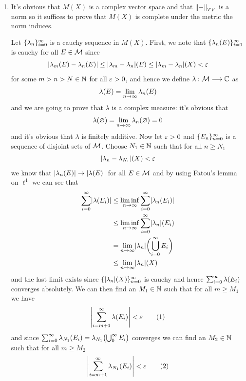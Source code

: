 \documentclass{article}
\begin{document}
\begin{homeworkProblem}
    \begin{enumerate}[label=\alph*.]
        \item It's obvious that $M(X)$ is a complex vector space and that $\norm{-}_{TV}$ is a norm so it suffices to prove that $M(X)$ is complete under the metric the norm induces.
        
        Let $\{\lambda_n\}_{i=0}^\infty$ is a cauchy sequence in $M(X)$. First, we note that $\{\lambda_n(E)\}_{i=0}^\infty$ is cauchy for all $E\in\mathcal{M}$ since
        \[\abs{\lambda_m(E)-\lambda_n(E)} \leq \abs{\lambda_m-\lambda_n}(E) \leq \abs{\lambda_m-\lambda_n}(X) < \eps\]
        for some $m>n>N\in\mathbb{N}$ for all $\varepsilon>0$, and hence we define $\lambda:\mathcal{M}\longrightarrow \mathbb{C}$ as
        \[\lambda(E) = \lim_{n\to\infty}\lambda_n(E)\]
        and we are going to prove that $\lambda$ is a complex measure: it's obvious that
        \[\lambda(\varnothing)=\lim_{n\to\infty}\lambda_n(\varnothing)=0\]
        and it's obvious that $\lambda$ is finitely additive. Now let $\varepsilon>0$ and $\{E_n\}_{n=0}^\infty$ is a sequence of disjoint sets of $\mathcal{M}$. Choose $N_1\in\mathbb{N}$ such that for all $n\geq N_1$
        \[\abs{\lambda_n-\lambda_{N_1}}(X)<\eps\]
        we know that $\abs{\lambda_n(E)}\to\abs{\lambda(E)}$ for all $E\in\mathcal{M}$ and by using Fatou's lemma on $\ell^1$ we can see that
        \begin{align*}
            \sum_{i=0}^\i\abs{\lambda(E_i)} &\leq \liminf_{n\to\i}\sum_{i=0}^\i\abs{\lambda_n(E_i)} \\
            &\leq \liminf_{n\to\i}\sum_{i=0}^\i\abs{\lambda_n}(E_i) \\
            &= \lim_{n\to\i}\abs{\lambda_n}\biggl(\bigcup_{i=0}^\i E_i\biggr) \\
            &\leq \lim_{n\to\i}\abs{\lambda_n}(X)
        \end{align*}
        and the last limit exists since $\{\abs{\lambda_n}(X)\}_{n=0}^\i$ is cauchy and hence $\sum_{i=0}^\infty\lambda(E_i)$ converges absolutely. We can then find an $M_1\in\mathbb{N}$ such that for all $m\geq M_1$ we have
        \begin{equation}
            \abs{\sum_{i=m+1}^\i\lambda(E_i)}<\eps \tag{1}
        \end{equation}
        and since $\sum_{i=0}^\infty \lambda_{N_1}(E_i) = \lambda_{N_1}\bigl(\bigcup_0^\infty E_i\bigr)$ converges we can find an $M_2\in\mathbb{N}$ such that for all $m\geq M_2$
        \begin{equation}
            \abs{\sum_{i=m+1}^\i\lambda_{N_1}(E_i)}<\eps \tag{2}

\end{equation}
\end{enumerate}
\end{homeworkProblem}
\end{document}
